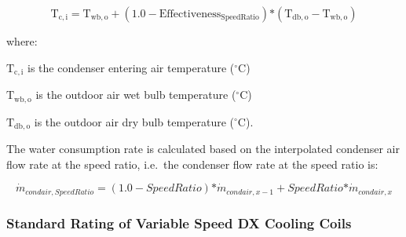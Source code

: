 \begin{equation}
{{\mathrm{T}}_{{\mathrm{c}},{\mathrm{i}}}} = {{\mathrm{T}}_{{\mathrm{wb}},{\mathrm{o}}}} + (1.0 - {\mathrm{Effectivenes}}{{\mathrm{s}}_{{\mathrm{SpeedRatio}}}}){\mathrm{*}}({{\mathrm{T}}_{{\mathrm{db}},{\mathrm{o}}}} - {{\mathrm{T}}_{{\mathrm{wb}},{\mathrm{o}}}})
\end{equation}

where:

\({{\mathrm{T}}_{{\mathrm{c}},{\mathrm{i}}}}\) is the condenser entering air temperature (\(^{\circ}\)C)

\({{\mathrm{T}}_{{\mathrm{wb}},{\mathrm{o}}}}\) is the outdoor air wet bulb temperature (\(^{\circ}\)C)

\({{\mathrm{T}}_{{\mathrm{db}},{\mathrm{o}}}}\) is the outdoor air dry bulb temperature (\(^{\circ}\)C).

The water consumption rate is calculated based on the interpolated condenser air flow rate at the speed ratio, i.e.~the condenser flow rate at the speed ratio is:

\begin{equation}
{\dot m_{condair,{\mathrm{}}SpeedRatio}} = \left( {1.0 - SpeedRatio} \right){\mathrm{*}}{\dot m_{condair,{\mathrm{}}x - 1}} + SpeedRatio{\mathrm{*}}{\dot m_{condair,{\mathrm{}}x}}
\end{equation}

\subsubsection{Standard Rating of Variable Speed DX Cooling Coils}\label{standard-rating-of-variable-speed-dx-cooling-coils}

